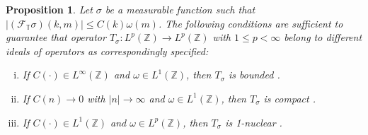 \documentclass[pdflatex,sn-mathphys-num]{sn-jnl}%
\theoremstyle{thmstyleone}%
\newtheorem{proposition}[theorem]{Proposition}
\theoremstyle{thmstyletwo}%
\theoremstyle{thmstylethree}%
\begin{document}
\begin{proposition}\label{Base theorem}
    Let $\sigma$ be a measurable function such that $|(\mathcal{F}_{\mathbb{T}} \sigma)(k,m)|\leq C(k)\omega(m)$. The following conditions are sufficient to guarantee that operator $T_\sigma:L^p(\mathbb{Z})\to L^p(\mathbb{Z}) $ with $1\leq p<\infty$ belong to different ideals of operators as correspondingly specified: \begin{enumerate}[(i).]
        \item If $C(\cdot)\in L^\infty(\mathbb{Z})$ and $\omega\in L^1(\mathbb{Z}) $, then $T_\sigma$ is bounded \cite[Theorem 3.2]{molahajloo2010pseudo}.\label{Base theorem i}
        \item If $C(n)\to 0 $ with $|n|\to\infty$ and $\omega\in L^1(\mathbb{Z}) $, then $T_\sigma$ is compact \cite[Theorem 3.3]{molahajloo2010pseudo}.\label{Base theorem ii}
        \item If $C(\cdot)\in L^1(\mathbb{Z})$ and $\omega\in L^p(\mathbb{Z}) $, then $T_\sigma$ is 1-nuclear \cite[Theorem 2.3]{delgado2013p}.\label{Base theorem iii}
    \end{enumerate}
\end{proposition}
\end{document}
